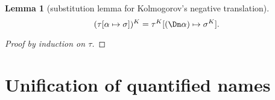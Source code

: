 \documentclass{amsart}
\newtheorem{lemma}[subsection]{Lemma}
\begin{document}
\begin{lemma}
[substitution lemma for Kolmogorov's negative translation]
\label{lem:subst-kolmogorov}
\[
(\tau[\alpha\mapsto\sigma])^K =
\tau^K[(\Dn\alpha) \mapsto \sigma^K].
\]
\end{lemma}

\begin{proof}
[Proof by induction on $\tau$]
\end{proof}

\section{Unification of quantified names}
\label{sec:unify}
\end{document}
